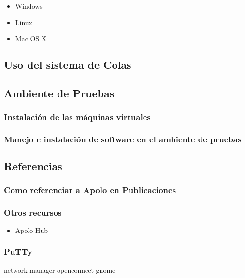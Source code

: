 \begin{itemize}
\item Windows
\item Linux
\item Mac OS X
\end{itemize}

\subsection{Uso del sistema de Colas}


\subsection{Ambiente de Pruebas}
\subsubsection{Instalación de las máquinas virtuales}
\subsubsection{Manejo e instalación de software en el ambiente de pruebas}

\subsection{Referencias}


\subsubsection{Como referenciar a Apolo en Publicaciones}



\subsubsection{Otros recursos}
	\begin{itemize}
	\item Apolo Hub
	\end{itemize}



\subsubsection{PuTTy}

network-manager-openconnect-gnome

